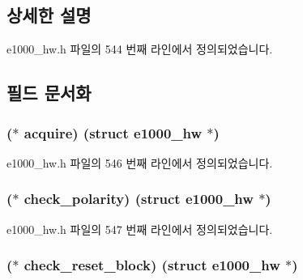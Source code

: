 \subsection{상세한 설명}


e1000\+\_\+hw.\+h 파일의 544 번째 라인에서 정의되었습니다.



\subsection{필드 문서화}
\subsubsection[{\texorpdfstring{acquire}{acquire}}]{($\ast$ acquire) (struct {\bf e1000\+\_\+hw} $\ast$)}\hypertarget{structe1000__phy__operations_a8509a9e3db6050cb00cecc1a855a70ed}{}\label{structe1000__phy__operations_a8509a9e3db6050cb00cecc1a855a70ed}


e1000\+\_\+hw.\+h 파일의 546 번째 라인에서 정의되었습니다.

\subsubsection[{\texorpdfstring{check\+\_\+polarity}{check_polarity}}]{($\ast$ check\+\_\+polarity) (struct {\bf e1000\+\_\+hw} $\ast$)}\hypertarget{structe1000__phy__operations_adf880b61cb2c5833fbb8e01e8d277fde}{}\label{structe1000__phy__operations_adf880b61cb2c5833fbb8e01e8d277fde}


e1000\+\_\+hw.\+h 파일의 547 번째 라인에서 정의되었습니다.

\subsubsection[{\texorpdfstring{check\+\_\+reset\+\_\+block}{check_reset_block}}]{($\ast$ check\+\_\+reset\+\_\+block) (struct {\bf e1000\+\_\+hw} $\ast$)}\hypertarget{structe1000__phy__operations_a7803e367ac5c93cfef01ab5b87b0faf4}{}\label{structe1000__phy__operations_a7803e367ac5c93cfef01ab5b87b0faf4}


